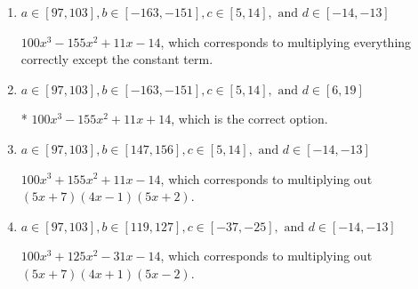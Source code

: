 \documentclass{extbook}[14pt]
\begin{document}
\begin{enumerate}
{\begin{enumerate}[label=\Alph*.]
$100x^{3} +75 x^{2} -81 x + 14$, which corresponds to multiplying out $(5x + 7)(4x -1)(5x -2)$.
\item \( a \in [97, 103], b \in [-163, -151], c \in [5, 14], \text{ and } d \in [-14, -13] \)

$100x^{3} -155 x^{2} +11 x -14$, which corresponds to multiplying everything correctly except the constant term.
\item \( a \in [97, 103], b \in [-163, -151], c \in [5, 14], \text{ and } d \in [6, 19] \)

* $100x^{3} -155 x^{2} +11 x + 14$, which is the correct option.
\item \( a \in [97, 103], b \in [147, 156], c \in [5, 14], \text{ and } d \in [-14, -13] \)

$100x^{3} +155 x^{2} +11 x -14$, which corresponds to multiplying out $(5x + 7)(4x -1)(5x + 2)$.
\item \( a \in [97, 103], b \in [119, 127], c \in [-37, -25], \text{ and } d \in [-14, -13] \)

$100x^{3} +125 x^{2} -31 x -14$, which corresponds to multiplying out $(5x + 7)(4x + 1)(5x -2)$.
\end{enumerate}

}
\end{enumerate}
\end{document}
